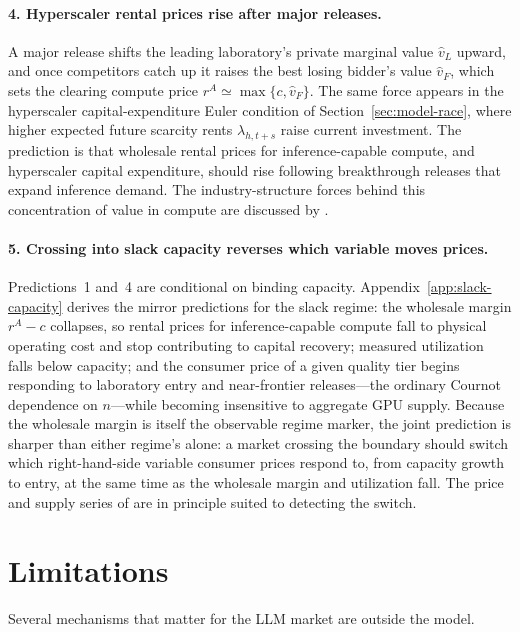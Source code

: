 \documentclass[11pt]{article}
\begin{document}
\paragraph{4. Hyperscaler rental prices rise after major releases.} A major release shifts the leading laboratory's private marginal value $\widehat v_L$ upward, and once competitors catch up it raises the best losing bidder's value $\widehat v_F$, which sets the clearing compute price $r^A\simeq\max\{c,\widehat v_F\}$. The same force appears in the hyperscaler capital-expenditure Euler condition of Section~\ref{sec:model-race}, where higher expected future scarcity rents $\lambda_{h,t+s}$ raise current investment. The prediction is that wholesale rental prices for inference-capable compute, and hyperscaler capital expenditure, should rise following breakthrough releases that expand inference demand. The industry-structure forces behind this concentration of value in compute are discussed by \citet{korinekVipra2025}.

\paragraph{5. Crossing into slack capacity reverses which variable moves prices.} Predictions~1 and~4 are conditional on binding capacity. Appendix~\ref{app:slack-capacity} derives the mirror predictions for the slack regime: the wholesale margin $r^{A}-c$ collapses, so rental prices for inference-capable compute fall to physical operating cost and stop contributing to capital recovery; measured utilization falls below capacity; and the consumer price of a given quality tier begins responding to laboratory entry and near-frontier releases---the ordinary Cournot dependence on $n$---while becoming insensitive to aggregate GPU supply. Because the wholesale margin is itself the observable regime marker, the joint prediction is sharper than either regime's alone: a market crossing the boundary should switch which right-hand-side variable consumer prices respond to, from capacity growth to entry, at the same time as the wholesale margin and utilization fall. The price and supply series of \citet{demirerEtAl2025} are in principle suited to detecting the switch.

\section{Limitations}
\label{sec:limitations}

Several mechanisms that matter for the LLM market are outside the model.
\end{document}
